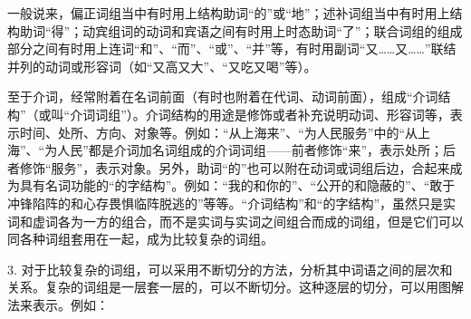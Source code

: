 一般说来，偏正词组当中有时用上结构助词“的”或“地”；述补词组当中有时用上结构助词“得”；动宾组词的动词和宾语之间有时用上时态助词“了”；联合词组的组成部分之间有时用上连词“和”、“而”、“或”、“并”等，有时用副词“又……又……”联结并列的动词或形容词（如“又高又大”、“又吃又喝”等）。

至于介词，经常附着在名词前面（有时也附着在代词、动词前面），组成“介词结构”（或叫“介词词组”）。介词结构的用途是修饰或者补充说明动词、形容词等，表示时间、处所、方向、对象等。例如：“从上海来”、“为人民服务”中的“从上海”、“为人民”都是介词加名词组成的介词词组——前者修饰“来”，表示处所；后者修饰“服务”，表示对象。另外，助词“的”也可以附在动词或词组后边，合起来成为具有名词功能的“的字结构”。例如：“我的和你的”、“公开的和隐蔽的”、“敢于冲锋陷阵的和心存畏惧临阵脱逃的”等等。“介词结构”和“的字结构”，虽然只是实词和虚词各为一方的组合，而不是实词与实词之间组合而成的词组，但是它们可以同各种词组套用在一起，成为比较复杂的词组。

3. 对于比较复杂的词组，可以采用不断切分的方法，分析其中词语之间的层次和关系。复杂的词组是一层套一层的，可以不断切分。这种逐层的切分，可以用图解法来表示。例如：

